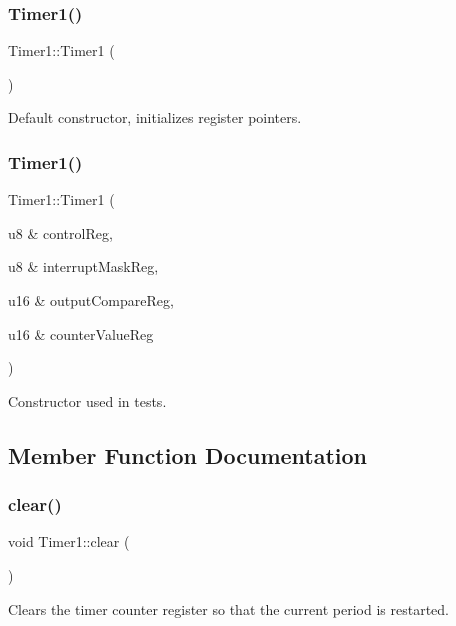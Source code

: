 \subsubsection{\texorpdfstring{Timer1()}{Timer1()}\hspace{0.1cm}{\footnotesize\ttfamily [1/2]}}
{\footnotesize\ttfamily Timer1\+::\+Timer1 (\begin{DoxyParamCaption}{ }\end{DoxyParamCaption})}

Default constructor, initializes register pointers. \mbox{\label{class_timer1_aef700b65fd584470d6d672ff5df5e6fa}} 
\subsubsection{\texorpdfstring{Timer1()}{Timer1()}\hspace{0.1cm}{\footnotesize\ttfamily [2/2]}}
{\footnotesize\ttfamily Timer1\+::\+Timer1 (\begin{DoxyParamCaption}\item[{u8 \&}]{control\+Reg,  }\item[{u8 \&}]{interrupt\+Mask\+Reg,  }\item[{u16 \&}]{output\+Compare\+Reg,  }\item[{u16 \&}]{counter\+Value\+Reg }\end{DoxyParamCaption})}

Constructor used in tests. 

\subsection{Member Function Documentation}
\mbox{\label{class_timer1_a86a26557d431f334c14524a4c63b2bbe}} 
\subsubsection{\texorpdfstring{clear()}{clear()}}
{\footnotesize\ttfamily void Timer1\+::clear (\begin{DoxyParamCaption}{ }\end{DoxyParamCaption})\hspace{0.3cm}{\ttfamily [virtual]}}

Clears the timer counter register so that the current period is restarted. 

